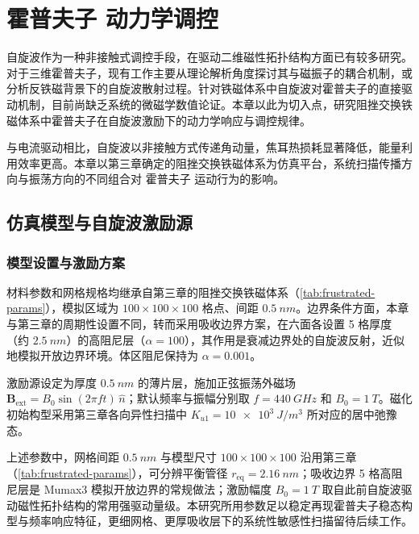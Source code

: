 \chapter{霍普夫子 动力学调控}

自旋波作为一种非接触式调控手段，在驱动二维磁性拓扑结构方面已有较多研究\cite{ding2015motion,huang2023transient,shen2018skyrmionium}。对于三维霍普夫子，现有工作主要从理论解析角度探讨其与磁振子的耦合机制\cite{saji2023magnonic}，或分析反铁磁背景下的自旋波散射过程\cite{zhang2023magnon}。针对铁磁体系中自旋波对霍普夫子的直接驱动机制，目前尚缺乏系统的微磁学数值论证。本章以此为切入点，研究阻挫交换铁磁体系中霍普夫子在自旋波激励下的动力学响应与调控规律。


与电流驱动相比，自旋波以非接触方式传递角动量，焦耳热损耗显著降低，能量利用效率更高。本章以第三章确定的阻挫交换铁磁体系为仿真平台，系统扫描传播方向与振荡方向的不同组合对 霍普夫子 运动行为的影响。

\section{仿真模型与自旋波激励源}

\subsection{模型设置与激励方案}
材料参数和网格规格均继承自第三章的阻挫交换铁磁体系（\cref{tab:frustrated-params}），模拟区域为 $100 \times 100 \times 100$ 格点、间距 $\SI{0.5}{nm}$。边界条件方面，本章与第三章的周期性设置不同，转而采用吸收边界方案，在六面各设置 5 格厚度（约 $\SI{2.5}{nm}$）的高阻尼层（$\alpha = 100$），其作用是衰减边界处的自旋波反射，近似地模拟开放边界环境。体区阻尼保持为 $\alpha = 0.001$。

激励源设定为厚度 $\SI{0.5}{nm}$ 的薄片层，施加正弦振荡外磁场 $\mathbf{B}_{\text{ext}} = B_0 \sin(2\pi f t) \, \hat{n}$；默认频率与振幅分别取 $f = \SI{440}{GHz}$ 和 $B_0 = \SI{1}{T}$。磁化初始构型采用第三章各向异性扫描中 $K_{u1} = \SI{10e3}{J/m^3}$ 所对应的居中弛豫态。

上述参数中，网格间距 $\SI{0.5}{nm}$ 与模型尺寸 $100 \times 100 \times 100$ 沿用第三章（\cref{tab:frustrated-params}），可分辨平衡管径 $r_{\text{eq}} = \SI{2.16}{nm}$；吸收边界 5 格高阻尼层是 Mumax3 模拟开放边界的常规做法\cite{vansteenkiste2014design}；激励幅度 $B_0 = \SI{1}{T}$ 取自此前自旋波驱动磁性拓扑结构的常用强驱动量级\cite{ding2015motion,sallermann2023stability}。本研究所用参数足以稳定再现霍普夫子稳态构型与频率响应特征，更细网格、更厚吸收层下的系统性敏感性扫描留待后续工作。

